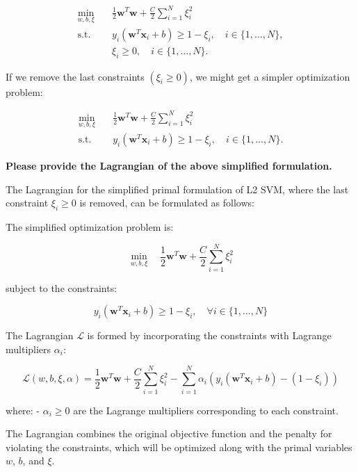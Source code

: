 \begin{align}
    \min_{w, b, \xi} \quad & \frac{1}{2} \mathbf{w}^T \mathbf{w} + \frac{C}{2} \sum_{i=1}^{N} \xi_i^2 \label{eq:svm_objective} \\
    \text{s.t.} \quad & y_i (\mathbf{w}^T \mathbf{x}_i + b) \geq 1 - \xi_i, \quad i \in \{1, \ldots, N\}, \label{eq:svm_constraint1} \\
    & \xi_i \geq 0, \quad i \in \{1, \ldots, N\}. \label{eq:svm_constraint2}
\end{align}




If we remove the last constraints \((\xi_i \geq 0)\), we might get a simpler optimization problem:

\begin{align}
    \min_{w, b, \xi} \quad & \frac{1}{2} \mathbf{w}^T \mathbf{w} + \frac{C}{2} \sum_{i=1}^{N} \xi_i^2 \label{eq:svm_objective} \\
    \text{s.t.} \quad & y_i (\mathbf{w}^T \mathbf{x}_i + b) \geq 1 - \xi_i, \quad i \in \{1, \ldots, N\}. \label{eq:svm_constraint}
\end{align}


\textbf{Please provide the Lagrangian of the above simplified formulation.}

The Lagrangian for the simplified primal formulation of L2 SVM, where the last constraint \(\xi_i \geq 0\) is removed, can be formulated as follows:

The simplified optimization problem is:

\[
\min_{w, b, \xi} \quad \frac{1}{2} \mathbf{w}^T \mathbf{w} + \frac{C}{2} \sum_{i=1}^{N} \xi_i^2
\]

subject to the constraints:

\[
y_i (\mathbf{w}^T \mathbf{x}_i + b) \geq 1 - \xi_i, \quad \forall i \in \{1, \ldots, N\}
\]

The Lagrangian \(\mathcal{L}\) is formed by incorporating the constraints with Lagrange multipliers \(\alpha_i\):

\[
\mathcal{L}(w, b, \xi, \alpha) = \frac{1}{2} \mathbf{w}^T \mathbf{w} + \frac{C}{2} \sum_{i=1}^{N} \xi_i^2 - \sum_{i=1}^{N} \alpha_i \left( y_i (\mathbf{w}^T \mathbf{x}_i + b) - (1 - \xi_i) \right)
\]

where:
- \(\alpha_i \geq 0\) are the Lagrange multipliers corresponding to each constraint.

The Lagrangian combines the original objective function and the penalty for violating the constraints, which will be optimized along with the primal variables \(w\), \(b\), and \(\xi\).


